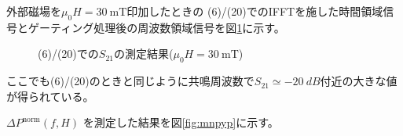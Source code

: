 \documentclass[dvipdfmx,11pt]{jsreport}
\numberwithin{equation}{chapter}
\numberwithin{table}{chapter}
\begin{document}
外部磁場を$\mu_0 H=\SI{30}{\milli \tesla}$印加したときの
(6)/(20)でのIFFTを施した時間領域信号とゲーティング処理後の周波数領域信号を図\ref{fig:k3}に示す。
\begin{figure}[H]
	\centering
    \caption{(6)/(20)での$S_{21}$の測定結果($\mu_0 H=\SI{30}{\milli \tesla}$)}
    \label{fig:k3}
\end{figure}
ここでも(6)/(20)のときと同じように共鳴周波数で$S_{21}\simeq \SI{-20}{dB}$付近の大きな値が得られている。

$\Delta P^{\text{norm}}(f,H)$ を測定した結果を図\ref{fig:mnpyp}に示す。
\end{document}
